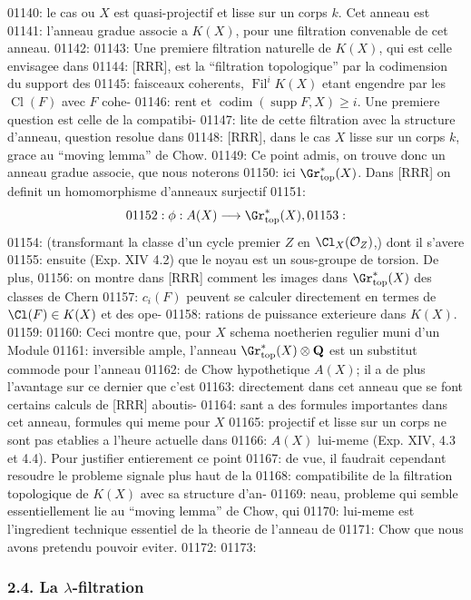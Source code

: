 01140: le cas ou $X$ est quasi-projectif et lisse sur un corps $k$. Cet anneau est
01141: l'anneau gradue associe a $K(X)$, pour une filtration convenable de cet anneau.
01142: 
01143: Une premiere filtration naturelle de $K(X)$, qui est celle envisagee dans
01144: [RRR], est la ``filtration topologique'' par la codimension du support des
01145: faisceaux coherents, $\operatorname{Fil}^i K(X)$ etant engendre par les $\operatorname{Cl}(F)$ avec $F$ cohe-
01146: rent et $\operatorname{codim}(\operatorname{supp} F, X) \geq i$. Une premiere question est celle de la compatibi-
01147: lite de cette filtration avec la structure d'anneau, question resolue dans
01148: [RRR], dans le cas $X$ lisse sur un corps $k$, grace au ``moving lemma'' de Chow.
01149: Ce point admis, on trouve donc un anneau gradue associe, que nous noterons
01150: ici $\Gr^*_{\mathrm{top}}(X)$. Dans [RRR] on definit un homomorphisme d'anneaux surjectif
01151: \[
01152: \phi: A(X) \longrightarrow \Gr^*_{\mathrm{top}}(X),
01153: \]
01154: (transformant la classe d'un cycle premier $Z$ en $\Cl_X(\mathcal{O}_Z)$,) dont il s'avere
01155: ensuite (Exp. XIV 4.2) que le noyau est un sous-groupe de torsion. De plus,
01156: on montre dans [RRR] comment les images dans $\Gr^*_{\mathrm{top}}(X)$ des classes de Chern
01157: $c_i(F)$ peuvent se calculer directement en termes de $\Cl(F) \in K(X)$ et des ope-
01158: rations de puissance exterieure dans $K(X)$.
01159: 
01160: Ceci montre que, pour $X$ schema noetherien regulier muni d'un Module
01161: inversible ample, l'anneau $\Gr^*_{\mathrm{top}}(X) \otimes \mathbf{Q}$ est un substitut commode pour l'anneau
01162: de Chow hypothetique $A(X)$; il a de plus l'avantage sur ce dernier que c'est
01163: directement dans cet anneau que se font certains calculs de [RRR] aboutis-
01164: sant a des formules importantes dans cet anneau, formules qui meme pour $X$
01165: projectif et lisse sur un corps ne sont pas etablies a l'heure actuelle dans
01166: $A(X)$ lui-meme (Exp. XIV, 4.3 et 4.4). Pour justifier entierement ce point
01167: de vue, il faudrait cependant resoudre le probleme signale plus haut de la
01168: compatibilite de la filtration topologique de $K(X)$ avec sa structure d'an-
01169: neau, probleme qui semble essentiellement lie au ``moving lemma'' de Chow, qui
01170: lui-meme est l'ingredient technique essentiel de la theorie de l'anneau de
01171: Chow que nous avons pretendu pouvoir eviter.
01172: 
01173: \subsubsection*{2.4. La $\lambda$-filtration}
